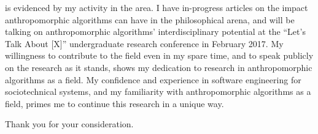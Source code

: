  is evidenced by my activity in the area. I have in-progress articles on the impact anthropomorphic algorithms can have in the philosophical arena, and will be talking on anthropomorphic algorithms' interdisciplinary potential at the ``Let's Talk About [X]'' undergraduate research conference in February 2017. My willingness to contribute to the field even in my spare time, and to speak publicly on the research as it stands, shows my dedication to research in anthropomorphic algorithms as a field. My confidence and experience in software engineering for sociotechnical systems, and my familiarity with anthropomorphic algorithms as a field, primes me to continue this research in a unique way.\par

\bigskip

Thank you for your consideration.\par




